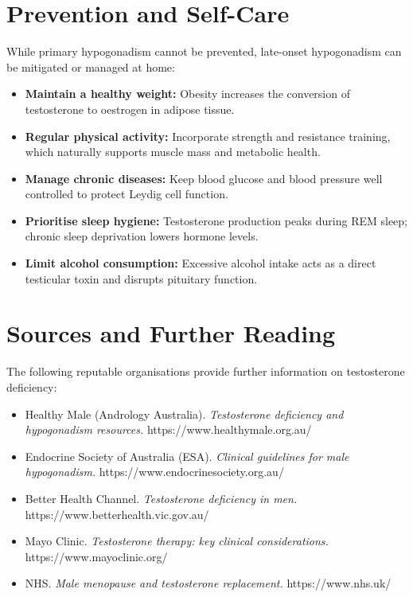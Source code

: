\section*{Prevention and Self-Care}
While primary hypogonadism cannot be prevented, late-onset hypogonadism can be mitigated or managed at home:
\begin{itemize}
    \item \textbf{Maintain a healthy weight:} Obesity increases the conversion of testosterone to oestrogen in adipose tissue.
    \item \textbf{Regular physical activity:} Incorporate strength and resistance training, which naturally supports muscle mass and metabolic health.
    \item \textbf{Manage chronic diseases:} Keep blood glucose and blood pressure well controlled to protect Leydig cell function.
    \item \textbf{Prioritise sleep hygiene:} Testosterone production peaks during REM sleep; chronic sleep deprivation lowers hormone levels.
    \item \textbf{Limit alcohol consumption:} Excessive alcohol intake acts as a direct testicular toxin and disrupts pituitary function.
\end{itemize}

\section*{Sources and Further Reading}
The following reputable organisations provide further information on testosterone deficiency:
\begin{itemize}
    \item Healthy Male (Andrology Australia). \textit{Testosterone deficiency and hypogonadism resources.} https://www.healthymale.org.au/
    \item Endocrine Society of Australia (ESA). \textit{Clinical guidelines for male hypogonadism.} https://www.endocrinesociety.org.au/
    \item Better Health Channel. \textit{Testosterone deficiency in men.} https://www.betterhealth.vic.gov.au/
    \item Mayo Clinic. \textit{Testosterone therapy: key clinical considerations.} https://www.mayoclinic.org/
    \item NHS. \textit{Male menopause and testosterone replacement.} https://www.nhs.uk/
\end{itemize}
